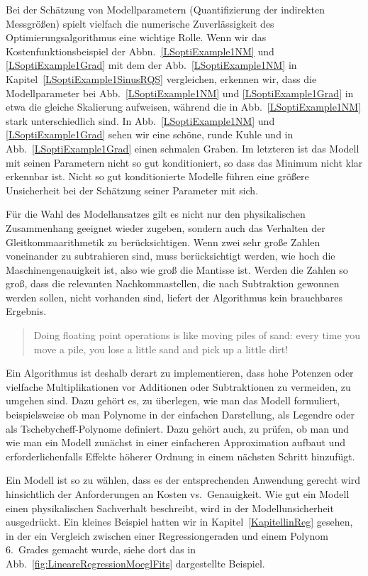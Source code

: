 Bei der Schätzung von Modellparametern (Quantifizierung der indirekten Messgrößen)
spielt vielfach die numerische Zuverlässigkeit des Optimierungsalgorithmus eine
wichtige Rolle. Wenn wir das Kostenfunktionsbeispiel der Abbn.~\ref{LSoptiExample1NM} und \ref{LSoptiExample1Grad} 
mit dem der Abb.~\ref{LSoptiExample1NM} in Kapitel~\ref{LSoptiExample1SinusRQS} vergleichen, 
erkennen wir, dass die Modellparameter bei Abb.~\ref{LSoptiExample1NM} und \ref{LSoptiExample1Grad} 
in etwa die gleiche Skalierung aufweisen, während die in Abb.~\ref{LSoptiExample1NM} stark unterschiedlich sind. In Abb.~\ref{LSoptiExample1NM} und \ref{LSoptiExample1Grad} sehen wir eine schöne, runde
Kuhle und in Abb.~\ref{LSoptiExample1Grad} einen schmalen Graben. Im letzteren ist das Modell mit seinen
Parametern nicht so gut konditioniert, so dass das Minimum nicht klar erkennbar ist.
Nicht so gut konditionierte Modelle führen eine größere Unsicherheit bei der Schätzung
seiner Parameter mit sich.

Für die Wahl des Modellansatzes gilt es nicht nur den physikalischen Zusammenhang
geeignet wieder zugeben, sondern auch das Verhalten der Gleitkommaarithmetik zu
berücksichtigen. Wenn zwei sehr große Zahlen voneinander zu subtrahieren sind, muss
berücksichtigt werden, wie hoch die Maschinengenauigkeit ist, also wie groß die
Mantisse ist. Werden die Zahlen so groß, dass die relevanten Nachkommastellen, die
nach Subtraktion gewonnen werden sollen, nicht vorhanden sind, liefert der Algorithmus
kein brauchbares Ergebnis.
\begin{quote}
Doing floating point operations is like moving piles of sand: every
time you move a pile, you lose a little sand and pick up a little dirt!
\end{quote}
Ein Algorithmus ist deshalb derart zu implementieren, dass hohe Potenzen oder
vielfache Multiplikationen vor Additionen oder Subtraktionen zu vermeiden, zu umgehen
sind. Dazu gehört es, zu überlegen, wie man das Modell formuliert, beispielsweise
ob man Polynome in der einfachen Darstellung, als Legendre oder als Tschebycheff-Polynome
definiert. Dazu gehört auch, zu prüfen, ob man und wie man ein Modell zunächst in einer
einfacheren Approximation aufbaut und erforderlichenfalls Effekte höherer Ordnung in
einem nächsten Schritt hinzufügt.

Ein Modell ist so zu wählen, dass es der entsprechenden Anwendung gerecht wird
hinsichtlich der Anforderungen an Kosten vs.\ Genauigkeit. Wie gut ein Modell einen
physikalischen Sachverhalt beschreibt, wird in der Modellunsicherheit ausgedrückt.
Ein kleines Beispiel hatten wir in Kapitel~\ref{KapitellinReg} gesehen, in der ein Vergleich
zwischen einer Regressiongeraden und einem Polynom 6.\ Grades gemacht wurde, siehe
dort das in Abb.~\ref{fig:LineareRegressionMoeglFits} dargestellte Beispiel.


